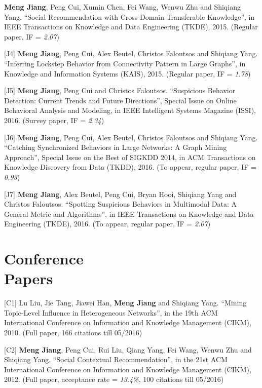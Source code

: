 \documentclass[margin, 10pt]{res} %
\begin{document}
\begin{resume}
[J3] {\bf Meng Jiang}, Peng Cui, Xumin Chen, Fei Wang, Wenwu Zhu and Shiqiang Yang. ``Social Recommendation with Cross-Domain Transferable Knowledge'', in IEEE Transactions on Knowledge and Data Engineering (TKDE), 2015. (Regular paper, IF = {\em 2.07})

[J4] {\bf Meng Jiang}, Peng Cui, Alex Beutel, Christos Faloutsos and Shiqiang Yang. ``Inferring Lockstep Behavior from Connectivity Pattern in Large Graphs'', in Knowledge and Information Systems (KAIS), 2015. (Regular paper, IF = {\em 1.78})

[J5] {\bf Meng Jiang}, Peng Cui and Christos Faloutsos. ``Suspicious Behavior Detection: Current Trends and Future Directions'', Special Issue on Online Behavioral Analysis and Modeling, in IEEE Intelligent Systems Magazine (ISSI), 2016. (Survey paper, IF = {\em 2.34})

[J6] {\bf Meng Jiang}, Peng Cui, Alex Beutel, Christos Faloutsos and Shiqiang Yang. ``Catching Synchronized Behaviors in Large Networks: A Graph Mining Approach'', Special Issue on the Best of SIGKDD 2014, in ACM Transactions on Knowledge Discovery from Data (TKDD), 2016. (To appear, regular paper, IF = {\em 0.93})

[J7] {\bf Meng Jiang}, Alex Beutel, Peng Cui, Bryan Hooi, Shiqiang Yang and Christos Faloutsos. ``Spotting Suspicious Behaviors in Multimodal Data: A General Metric and Algorithms'', in IEEE Transactions on Knowledge and Data Engineering (TKDE), 2016. (To appear, regular paper, IF = {\em 2.07})


\section{Conference \\ Papers}

[C1] Lu Liu, Jie Tang, Jiawei Han, {\bf Meng Jiang} and Shiqiang Yang. ``Mining Topic-Level Influence in Heterogeneous Networks'', in the 19th ACM International Conference on Information and Knowledge Management (CIKM), 2010. (Full paper, 166 citations till 05/2016)

[C2] {\bf Meng Jiang}, Peng Cui, Rui Liu, Qiang Yang, Fei Wang, Wenwu Zhu and Shiqiang Yang. ``Social Contextual Recommendation'', in the 21st ACM International Conference on Information and Knowledge Management (CIKM), 2012. (Full paper, acceptance rate = {\em 13.4\%}, 100 citations till 05/2016)


\end{resume}
\end{document}
